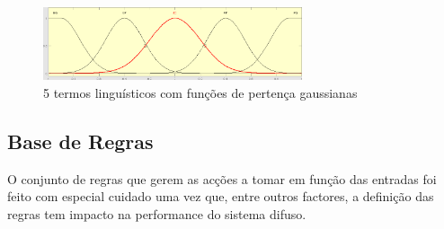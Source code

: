 \documentclass{article}
\begin{document}
\begin{figure}[!h]
  \centering
  \includegraphics[width=3in]{figures/gauss5}
  \caption{5 termos linguísticos com funções de pertença gaussianas}
  \label{gauss_5}
\end{figure}

\subsection{Base de Regras}
\indent \indent O conjunto de regras que gerem as acções a tomar em função das entradas foi feito com especial cuidado uma vez que, entre outros factores, a definição das regras tem impacto na performance do sistema difuso.
\end{document}
